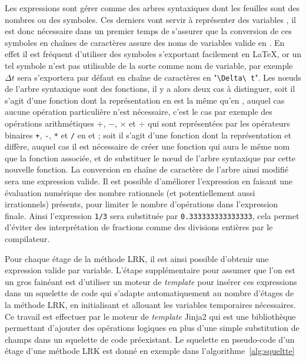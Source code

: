 Les expressions \sympy{} sont gérer comme des arbres syntaxiques dont les feuilles sont des nombres ou des symboles. Ces derniers vont servir à représenter des variables \CC, il est donc nécessaire dans un premier temps de s'assurer que la conversion de ces symboles en chaînes de caractères assure des noms de variables valide en \CC. En effet il est fréquent d'utiliser des symboles s'exportant facilement en \LaTeX{}, or un tel symbole n'est pas utilisable de la sorte comme nom de variable, par exemple $\Delta t$ sera s'exportera par défaut en chaîne de caractères en "\texttt{\textbackslash Delta\textbackslash\ t}". Les nœuds de l'arbre syntaxique sont des fonctions, il y a alors deux cas à distinguer, soit il s'agit d'une fonction dont la représentation en \Python{} est la même qu'en \CC, auquel cas aucune opération particulière n'est nécessaire, c'est le cas par exemple des opérations arithmétiques $+$, $-$, $\times$ et $\div$ qui sont représentées par les opérateurs binaires \texttt{+}, \texttt{-}, \texttt{*} et \texttt{/} en \Python{} et \CC{} ; soit il s'agit d'une fonction dont la représentation \Python{} et \CC{} diffère, auquel cas il est nécessaire de créer une fonction \sympy{} qui aura le même nom que la fonction \CC{} associée, et de substituer le nœud de l'arbre syntaxique par cette nouvelle fonction. La conversion en chaîne de caractère de l'arbre ainsi modifié sera une expression \CC{} valide. Il est possible d'améliorer l'expression \CC{} en faisant une évaluation numérique des nombre rationnels (et potentiellement aussi irrationnels) présents, pour limiter le nombre d'opérations dans l'expression finale. Ainsi l'expression \texttt{1/3} sera substituée par \texttt{0.333333333333333}, cela permet d'éviter des interprétation de fractions comme des divisions entières par le compilateur.

Pour chaque étage de la méthode LRK, il est ainsi possible d'obtenir une expression \CC{} valide par variable. L'étape supplémentaire pour assumer que l'on est un gros fainéant est d'utiliser un moteur de \emph{template} pour insérer ces expressions dans un squelette de code qui s'adapte automatiquement au nombre d'étages de la méthode LRK, en initialisant et allouant les variables temporaires nécessaires. Ce travail est effectuer par le moteur de \emph{template} Jinja2 qui est une bibliothèque \Python{} permettant d'ajouter des opérations logiques en plus d'une simple substitution de champs dans un squelette de code préexistant. Le squelette en pseudo-code d'un étage d'une méthode LRK est donné en exemple dans l'algorithme~\ref{alg:squeltte}

